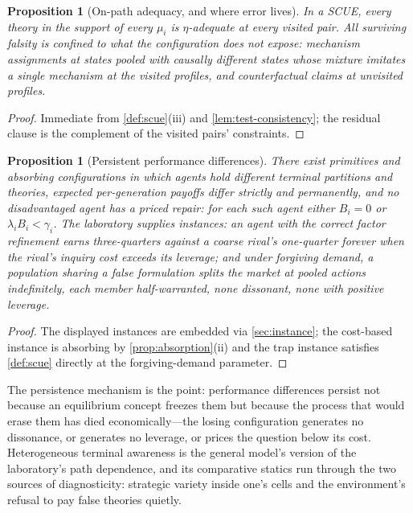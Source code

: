 \documentclass[11pt]{article}
\newtheorem{proposition}[assumption]{Proposition}
\begin{document}
\begin{proposition}[On-path adequacy, and where error lives]
\label{prop:onpath-adequacy}
In a SCUE, every theory in the support of every $\mu_i$ is $\eta$-adequate at
every visited pair.  All surviving falsity is confined to what the
configuration does not expose: mechanism assignments at states pooled with
causally different states whose mixture imitates a single mechanism at the
visited profiles, and counterfactual claims at unvisited profiles.
\end{proposition}

\begin{proof}
Immediate from \cref{def:scue}(iii) and \cref{lem:test-consistency}; the
residual clause is the complement of the visited pairs' constraints.
\end{proof}

\begin{proposition}[Persistent performance differences]
\label{prop:persistence}
There exist primitives and absorbing configurations in which agents hold
different terminal partitions and theories, expected per-generation payoffs
differ strictly and permanently, and no disadvantaged agent has a priced
repair: for each such agent either $B_i=0$ or $\lambda_iB_i<\gamma_i$.  The
laboratory supplies instances: an agent with the correct factor refinement
earns three-quarters against a coarse rival's one-quarter forever when the
rival's inquiry cost exceeds its leverage; and under forgiving demand, a
population sharing a false formulation splits the market at pooled actions
indefinitely, each member half-warranted, none dissonant, none with positive
leverage.
\end{proposition}

\begin{proof}
The displayed instances are \citep[the asymmetric-insight and trap
configurations of][]{FourStateNote} embedded via \cref{sec:instance}; the
cost-based instance is absorbing by \cref{prop:absorption}(ii) and the trap
instance satisfies \cref{def:scue} directly at the forgiving-demand
parameter.
\end{proof}

The persistence mechanism is the point: performance differences persist not
because an equilibrium concept freezes them but because the process that
would erase them has died economically---the losing configuration generates
no dissonance, or generates no leverage, or prices the question below its
cost.  Heterogeneous terminal awareness is the general model's version of the
laboratory's path dependence, and its comparative statics run through the two
sources of diagnosticity: strategic variety inside one's cells and the
environment's refusal to pay false theories quietly.
\end{document}
